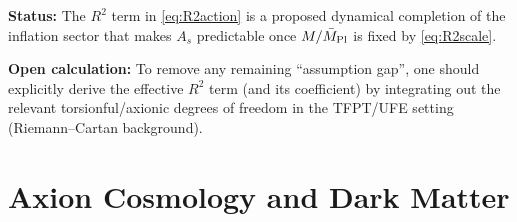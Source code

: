 \begin{tcolorbox}[colback=green!3, colframe=green!50!black, 
    title={\textbf{Status and Open Derivation Task}}, fonttitle=\bfseries\small]
\textbf{Status:} The $R^2$ term in \eqref{eq:R2action} is a proposed dynamical completion of the inflation sector that makes $A_s$ predictable once $M/\bar{M}_{\mathrm{Pl}}$ is fixed by \eqref{eq:R2scale}.

\textbf{Open calculation:} To remove any remaining ``assumption gap'', one should explicitly derive the effective $R^2$ term (and its coefficient) by integrating out the relevant torsionful/axionic degrees of freedom in the TFPT/UFE setting (Riemann--Cartan background).
\end{tcolorbox}

\section{Axion Cosmology and Dark Matter}

